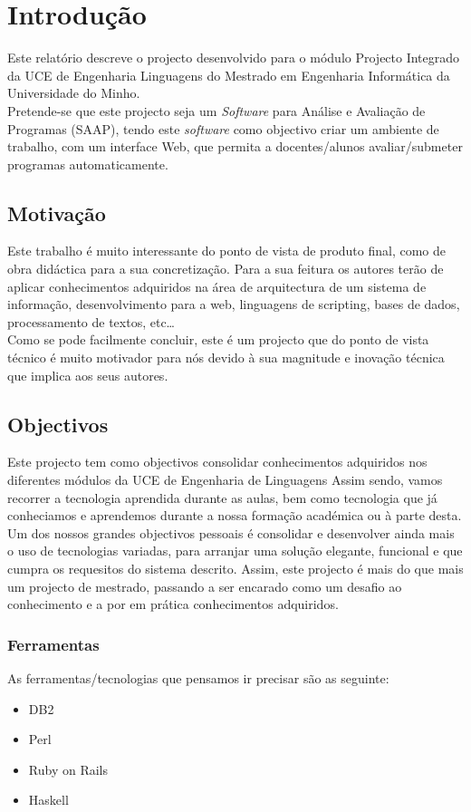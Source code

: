 \chapter{Introdução} \label{chap int}
Este relatório descreve o projecto desenvolvido para o módulo Projecto Integrado da UCE de Engenharia Linguagens do Mestrado em Engenharia Informática da Universidade do Minho.\\

Pretende-se que este projecto seja um \emph{Software} para Análise e Avaliação de Programas (SAAP), tendo este \emph{software} como objectivo criar um 
ambiente de trabalho, com um interface Web, que permita a docentes/alunos avaliar/submeter programas automaticamente.

\section{Motivação}
Este trabalho é muito interessante do ponto de vista de produto final, como de obra didáctica para a sua concretização. Para a sua feitura os autores terão de aplicar
conhecimentos adquiridos na área de arquitectura de um sistema de informação, desenvolvimento para a web, linguagens de scripting, bases de dados, processamento de textos, etc\ldots\\
Como se pode facilmente concluir, este é um projecto que do ponto de vista técnico é muito motivador para nós devido à sua magnitude e inovação técnica que implica aos seus autores.

\section{Objectivos}
Este projecto tem como objectivos consolidar conhecimentos adquiridos nos diferentes módulos da UCE de Engenharia de Linguagens
Assim sendo, vamos recorrer a tecnologia aprendida durante as aulas, bem como tecnologia que já conheciamos e aprendemos durante a nossa formação académica ou à parte desta.
Um dos nossos grandes objectivos pessoais é consolidar e desenvolver ainda mais o uso de tecnologias variadas, para arranjar uma solução elegante, funcional e que cumpra os requesitos do sistema descrito.
Assim, este projecto é mais do que mais um projecto de mestrado, passando a ser encarado como um desafio ao conhecimento e a por em prática conhecimentos adquiridos.

\subsection{Ferramentas}
As ferramentas/tecnologias que pensamos ir precisar são as seguinte:
\begin{itemize}
\item DB2
\item Perl
\item Ruby on Rails
\item Haskell
\end{itemize}

